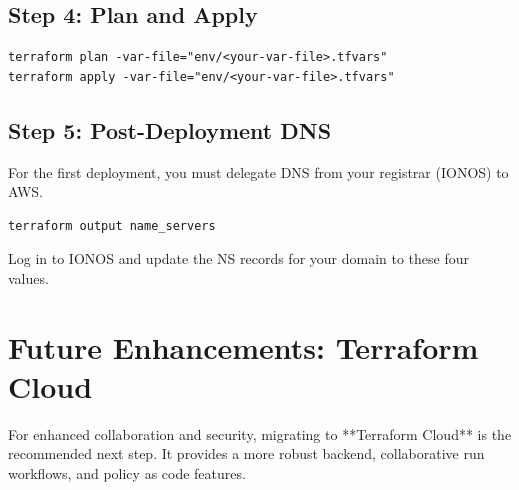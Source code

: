 \documentclass[a4paper,11pt]{article}
\begin{document}
\subsection{Step 4: Plan and Apply}
\begin{verbatim}
terraform plan -var-file="env/<your-var-file>.tfvars"
terraform apply -var-file="env/<your-var-file>.tfvars"
\end{verbatim}

\subsection{Step 5: Post-Deployment DNS}
For the first deployment, you must delegate DNS from your registrar (IONOS) to AWS.
\begin{verbatim}
terraform output name_servers
\end{verbatim}
Log in to IONOS and update the NS records for your domain to these four values.

\section{Future Enhancements: Terraform Cloud}
For enhanced collaboration and security, migrating to **Terraform Cloud** is the recommended next step. It provides a more robust backend, collaborative run workflows, and policy as code features.
\end{document}
